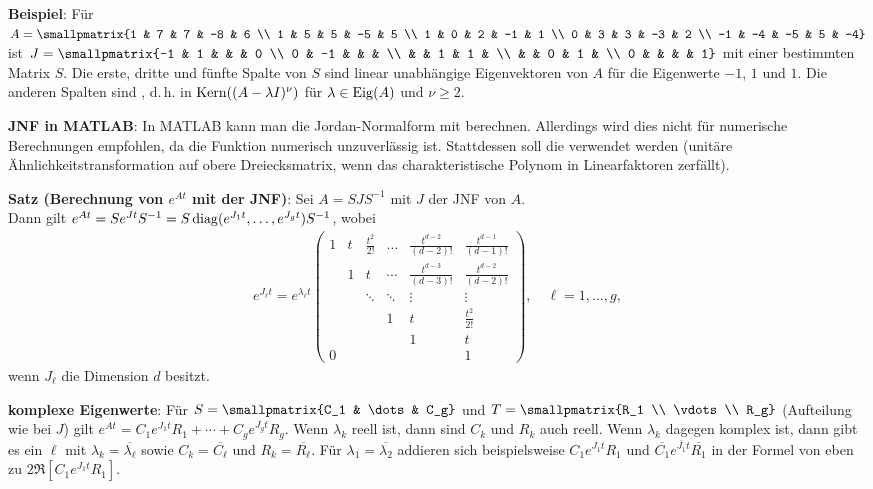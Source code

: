\textbf{Beispiel}:
Für $A = \smallpmatrix{1 & 7 & 7 & -8 & 6 \\ 1 & 5 & 5 & -5 & 5 \\ 1 & 0 & 2 & -1 & 1 \\
0 & 3 & 3 & -3 & 2 \\ -1 & -4 & -5 & 5 & -4}$ ist
$J = \smallpmatrix{-1 & 1 & & & 0 \\ 0 & -1 & & & \\ & & 1 & 1 & \\ & & 0 & 1 & \\ 0 & & & & 1}$
mit einer bestimmten Matrix $S$.
Die erste, dritte und fünfte Spalte von $S$ sind linear unabhängige Eigenvektoren von $A$
für die Eigenwerte $-1$, $1$ und $1$.
Die anderen Spalten sind ,
d.\,h. in $\operatorname{Kern}((A - \lambda I)^\nu)$ für $\lambda \in \operatorname{Eig}(A)$ und $\nu \ge 2$.

\textbf{JNF in MATLAB}:
In MATLAB kann man die Jordan-Normalform mit  berechnen.
Allerdings wird dies nicht für numerische Berechnungen empfohlen, da die Funktion
numerisch unzuverlässig ist.
Stattdessen soll die  verwendet werden
(unitäre Ähnlichkeitstransformation auf obere Dreiecksmatrix, wenn das charakteristische Polynom
in Linearfaktoren zerfällt).

\linie

\textbf{Satz (Berechnung von $e^{At}$ mit der JNF)}:
Sei $A = SJS^{-1}$ mit $J$ der JNF von $A$.\\
Dann gilt $e^{At} = S e^{Jt} S^{-1} = S \operatorname{diag}(e^{J_1 t}, \dotsc, e^{J_g t}) S^{-1}$, wobei
\begin{align*}
    e^{J_\ell t} = e^{\lambda_\ell t}
    \begin{pmatrix}
        1 & t & \frac{t^2}{2!} & \dots & \frac{t^{d-2}}{(d-2)!} & \frac{t^{d-1}}{(d-1)!} \\
        & 1 & t & \dotsb & \frac{t^{d-3}}{(d-3)!} & \frac{t^{d-2}}{(d-2)!} \\
        & & \ddots & \ddots & \vdots & \vdots \\
        & & & 1 & t & \frac{t^2}{2!} \\
        & & & & 1 & t \\
        0 & & & & & 1
    \end{pmatrix},\quad
    \ell = 1, \dotsc, g,
\end{align*}
wenn $J_\ell$ die Dimension $d$ besitzt.

\textbf{komplexe Eigenwerte}:
Für $S = \smallpmatrix{C_1 & \dots & C_g}$ und $T = \smallpmatrix{R_1 \\ \vdots \\ R_g}$
(Aufteilung wie bei $J$)
gilt $e^{At} = C_1 e^{J_1 t} R_1 + \dotsb + C_g e^{J_g t} R_g$.
Wenn $\lambda_k$ reell ist, dann sind $C_k$ und $R_k$ auch reell.
Wenn $\lambda_k$ dagegen komplex ist, dann gibt es ein $\ell$ mit
$\lambda_k = \overline{\lambda_\ell}$ sowie $C_k = \overline{C_\ell}$ und
$R_k = \overline{R_\ell}$.
Für $\lambda_1 = \overline{\lambda_2}$
addieren sich beispielsweise
$C_1 e^{J_1 t} R_1$ und $\overline{C_1} e^{\overline{J_1} t} \overline{R_1}$
in der Formel von eben zu $2\Re[C_1 e^{J_1 t} R_1]$.

